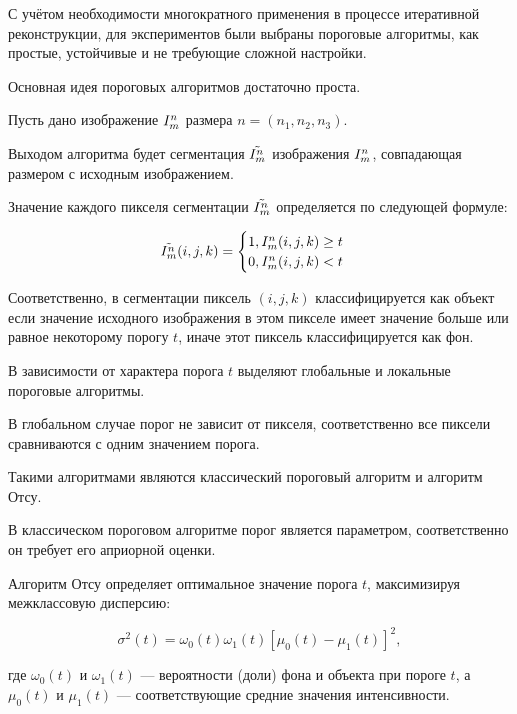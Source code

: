 С учётом необходимости многократного применения в процессе итеративной реконструкции, для экспериментов были выбраны пороговые алгоритмы, как простые, устойчивые и не требующие сложной настройки.

Основная идея пороговых алгоритмов достаточно проста. 

Пусть дано изображение \(I^n_m\) размера \(n = (n_1, n_2, n_3)\).

Выходом алгоритма будет сегментация \(\tilde{I^n_m}\) изображения \(I^n_m\), совпадающая размером с исходным изображением.

Значение каждого пикселя сегментации \(\tilde{I^n_m}\) определяется по следующей формуле:

\begin{equation} \label{eq:classicthresholding}
    \tilde{I^n_m} (i, j, k) = 
    \begin{cases}
        1, I^n_m(i, j, k) \geq t\\
        0, I^n_m(i, j, k) < t
    \end{cases}
\end{equation}

Соответственно, в сегментации пиксель \((i, j, k)\) классифицируется как объект если значение исходного изображения в этом пикселе имеет значение больше или равное некоторому порогу \(t\), иначе этот пиксель классифицируется как фон.

В зависимости от характера порога \(t\) выделяют глобальные и локальные пороговые алгоритмы.

В глобальном случае порог не зависит от пикселя, соответственно все пиксели сравниваются с одним значением порога.

Такими алгоритмами являются классический пороговый алгоритм и алгоритм Отсу.

В классическом пороговом алгоритме порог является параметром, соответственно он требует его априорной оценки.

Алгоритм Отсу \cite{otsu1975threshold} определяет оптимальное значение порога \(t\), максимизируя межклассовую дисперсию:

\begin{equation}
    \sigma^2(t) = \omega_0(t) \omega_1(t) \left[ \mu_0(t) - \mu_1(t) \right]^2,
\end{equation}

где \(\omega_0(t)\) и \(\omega_1(t)\) — вероятности (доли) фона и объекта при пороге \(t\), а \(\mu_0(t)\) и \(\mu_1(t)\) — соответствующие средние значения интенсивности.

